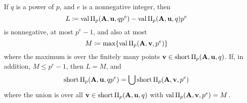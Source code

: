 \documentclass{article}
\begin{document}
\begin{theorem}
\label{general AIP: T}
If $q$ is a power of $p$, and $e$ is a nonnegative integer, then
\[  L \coloneqq \operatorname{val} \Pi_p(\mathbf{A}, \mathbf{u}, qp^e) -  \operatorname{val} \Pi_p(\mathbf{A}, \mathbf{u}, q)p^e  \]
is nonnegative, at most $p^e-1$, and also at most
\[ M \coloneqq \max \{ \operatorname{val} \Pi_p(\mathbf{A}, \mathbf{v}, p^e)  \}\]
where the maximum is over the finitely many points $\mathbf{v} \in \operatorname{short} \Pi_p(\mathbf{A}, \mathbf{u}, q)$.
If, in addition, $M \le p^e-1$,  then $L=M$, and
\[  \operatorname{short} \Pi_p(\mathbf{A}, \mathbf{u}, qp^e) = \bigcup \operatorname{short} \Pi_p(\mathbf{A}, \mathbf{v}, p^e)\]
where the union is over all $\mathbf{v} \in \operatorname{short} \Pi_p(\mathbf{A}, \mathbf{u}, q)$ with $\operatorname{val} \Pi_p(\mathbf{A},\mathbf{v},p^e) = M$.
\end{theorem}
\end{document}
